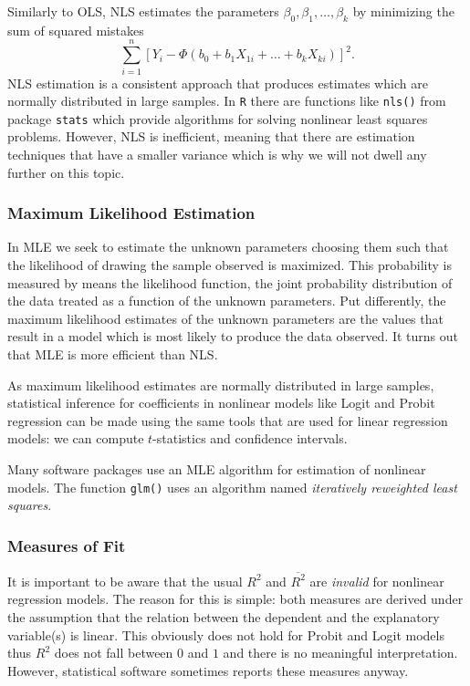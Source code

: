 \documentclass[]{book}
\theoremstyle{definition}
\theoremstyle{definition}
\theoremstyle{definition}
\theoremstyle{remark}
\begin{document}
Similarly to OLS, NLS estimates the parameters
\(\beta_0,\beta_1,\dots,\beta_k\) by minimizing the sum of squared
mistakes
\[\sum_{i=1}^n\left[ Y_i - \Phi(b_0 + b_1 X_{1i} + \dots + b_k X_{ki}) \right]^2.\]
NLS estimation is a consistent approach that produces estimates which
are normally distributed in large samples. In \texttt{R} there are
functions like \texttt{nls()} from package \texttt{stats} which provide
algorithms for solving nonlinear least squares problems. However, NLS is
inefficient, meaning that there are estimation techniques that have a
smaller variance which is why we will not dwell any further on this
topic.

\subsubsection*{Maximum Likelihood
Estimation}\label{maximum-likelihood-estimation}

In MLE we seek to estimate the unknown parameters choosing them such
that the likelihood of drawing the sample observed is maximized. This
probability is measured by means the likelihood function, the joint
probability distribution of the data treated as a function of the
unknown parameters. Put differently, the maximum likelihood estimates of
the unknown parameters are the values that result in a model which is
most likely to produce the data observed. It turns out that MLE is more
efficient than NLS.

As maximum likelihood estimates are normally distributed in large
samples, statistical inference for coefficients in nonlinear models like
Logit and Probit regression can be made using the same tools that are
used for linear regression models: we can compute \(t\)-statistics and
confidence intervals.

Many software packages use an MLE algorithm for estimation of nonlinear
models. The function \texttt{glm()} uses an algorithm named
\emph{iteratively reweighted least squares}.

\subsubsection*{Measures of Fit}\label{measures-of-fit}

It is important to be aware that the usual \(R^2\) and
\(\overline{R^2}\) are \emph{invalid} for nonlinear regression models.
The reason for this is simple: both measures are derived under the
assumption that the relation between the dependent and the explanatory
variable(s) is linear. This obviously does not hold for Probit and Logit
models thus \(R^2\) does not fall between \(0\) and \(1\) and there is
no meaningful interpretation. However, statistical software sometimes
reports these measures anyway.
\end{document}

